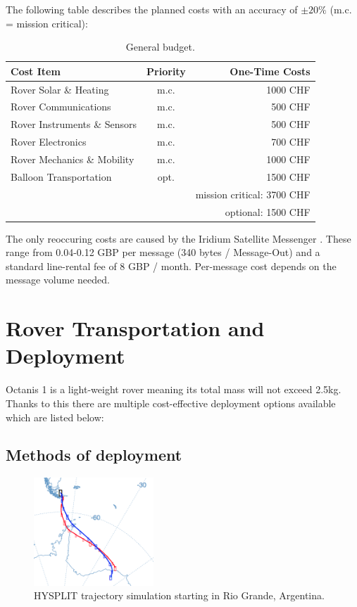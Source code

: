 \documentclass[a4paper,12pt]{article}
\begin{document}
The following table describes the planned costs with an accuracy of $\pm 20\%$ (m.c. = mission critical): \\ 

\begin{table}[h!]
\centering
\begin{tabular}{ l | c || r }
  Cost Item & Priority & One-Time Costs \\
  \hline
  Rover Solar \& Heating & m.c. & 1000 CHF \\
  Rover Communications & m.c. & 500 CHF \\
  Rover Instruments \& Sensors & m.c. & 500 CHF \\
  Rover Electronics & m.c. & 700 CHF \\
  Rover Mechanics \& Mobility & m.c. & 1000 CHF \\
  Balloon Transportation & opt. & 1500 CHF \\
  \hline \hline
  & & mission critical: 3700 CHF  \\
  & & optional: 1500 CHF \\
\end{tabular}
\caption{General budget.}
\end{table}


The only reoccuring costs are caused by the Iridium Satellite Messenger \cite{iridium}. These range from 0.04-0.12 GBP per message (340 bytes / Message-Out) and a standard line-rental fee of 8 GBP / month. Per-message cost depends on the message volume needed.



\section{Rover Transportation and Deployment}

Octanis 1 is a light-weight rover meaning its total mass will not exceed 2.5kg. Thanks to this there are multiple cost-effective deployment options available which are listed below:

\subsection{Methods of deployment}

\begin{figure}[h!]
	\centering
    \includegraphics[width=0.4\textwidth]{trajectory}
    \caption{HYSPLIT trajectory simulation starting in Rio Grande, Argentina.}
\end{figure}
\end{document}
